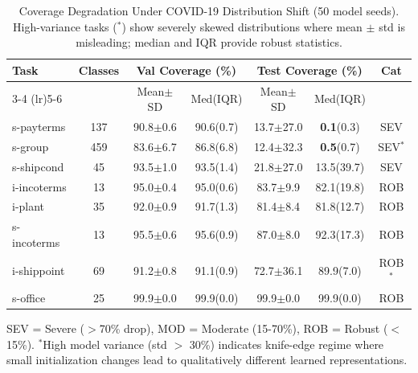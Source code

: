\begin{table}[t]
\centering
\caption{Coverage Degradation Under COVID-19 Distribution Shift (50 model seeds). 
High-variance tasks ($^*$) show severely skewed distributions where mean $\pm$ std 
is misleading; median and IQR provide robust statistics.}
\label{tab:main_results}
\small
\begin{tabular}{@{}lcccccc@{}}
\toprule
\multirow{2}{*}{Task} & \multirow{2}{*}{Classes} &
\multicolumn{2}{c}{Val Coverage (\%)} &
\multicolumn{2}{c}{Test Coverage (\%)} &
\multirow{2}{*}{Cat} \\
\cmidrule(lr){3-4} \cmidrule(lr){5-6}
& & Mean$\pm$SD & Med(IQR) & Mean$\pm$SD & Med(IQR) & \\
\midrule
s-payterms & 137 & 90.8$\pm$0.6 & 90.6(0.7) & 13.7$\pm$27.0 & \textbf{0.1}(0.3) & SEV \\
s-group & 459 & 83.6$\pm$6.7 & 86.8(6.8) & 12.4$\pm$32.3 & \textbf{0.5}(0.7) & SEV$^*$ \\
s-shipcond & 45 & 93.5$\pm$1.0 & 93.5(1.4) & 21.8$\pm$27.0 & 13.5(39.7) & SEV \\
i-incoterms & 13 & 95.0$\pm$0.4 & 95.0(0.6) & 83.7$\pm$9.9 & 82.1(19.8) & ROB \\
i-plant & 35 & 92.0$\pm$0.9 & 91.7(1.3) & 81.4$\pm$8.4 & 81.8(12.7) & ROB \\
s-incoterms & 13 & 95.5$\pm$0.6 & 95.6(0.9) & 87.0$\pm$8.0 & 92.3(17.3) & ROB \\
i-shippoint & 69 & 91.2$\pm$0.8 & 91.1(0.9) & 72.7$\pm$36.1 & 89.9(7.0) & ROB$^*$ \\
s-office & 25 & 99.9$\pm$0.0 & 99.9(0.0) & 99.9$\pm$0.0 & 99.9(0.0) & ROB \\
\bottomrule
\end{tabular}
\vspace{1mm}

\raggedright
\footnotesize
SEV = Severe ($>$70\% drop), MOD = Moderate (15-70\%), ROB = Robust ($<$15\%).
$^*$High model variance (std $>$ 30\%) indicates knife-edge regime where small 
initialization changes lead to qualitatively different learned representations.
\end{table}